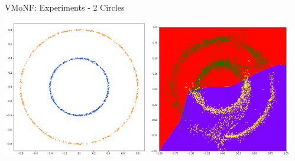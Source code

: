 \documentclass[12pt,ignorenonframetext,]{beamer}
\begin{document}
\begin{frame}{VMoNF: Experiments - 2 Circles}
\protect\hypertarget{vmonf-experiments---2-circles}{}

\centering

\includegraphics[width=0.475\textwidth]{figures/original_2_circles.png}
\hfill
\includegraphics[width=0.475\textwidth]{figures/trained_2_circles_2.png}

\end{frame}
\end{document}
